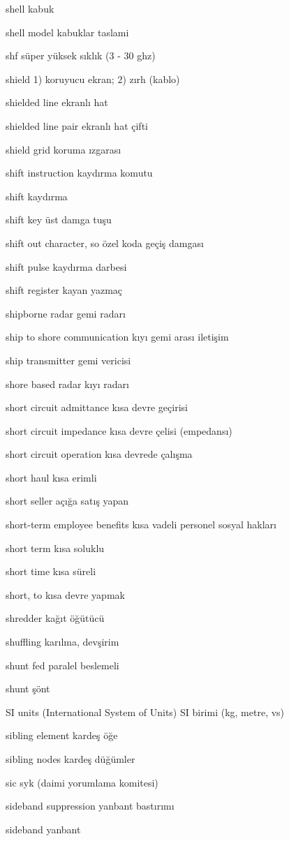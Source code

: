 \documentclass[12pt,fleqn]{article}\usepackage{../../common}
\begin{document}
shell kabuk

shell model kabuklar taslami

shf süper yüksek sıklık (3 - 30 ghz)

shield 1) koruyucu ekran; 2) zırh (kablo)

shielded line ekranlı hat

shielded line pair ekranlı hat çifti

shield grid koruma ızgarası

shift instruction kaydırma komutu

shift kaydırma

shift key üst damga tuşu

shift out character, so özel koda geçiş damgası

shift pulse kaydırma darbesi

shift register kayan yazmaç

shipborne radar gemi radarı

ship to shore communication kıyı gemi arası iletişim

ship transmitter gemi vericisi

shore based radar kıyı radarı

short circuit admittance kısa devre geçirisi

short circuit impedance kısa devre çelisi (empedansı)

short circuit operation kısa devrede çalışma

short haul kısa erimli

short seller açığa satış yapan

short-term employee benefits kısa vadeli personel sosyal hakları

short term kısa soluklu

short time kısa süreli

short, to kısa devre yapmak

shredder kağıt öğütücü

shuffling karılma, devşirim

shunt fed paralel beslemeli

shunt şönt

SI units (International System of Units) SI birimi (kg, metre, vs)

sibling element kardeş öğe

sibling nodes kardeş düğümler

sic syk (daimi yorumlama komitesi)

sideband suppression yanbant bastırımı

sideband yanbant
\end{document}
